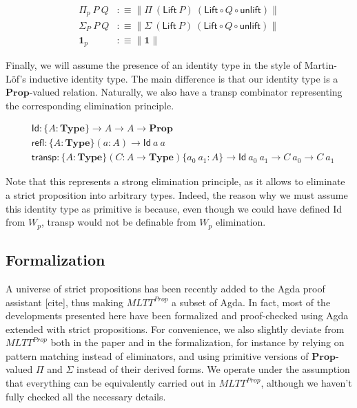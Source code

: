 \documentclass{easychair}
\newcommand{\mType}{\mathbf{Type}}
\newcommand{\mProp}{\mathbf{Prop}}
\begin{document}
\begin{align*}
  \Pi_p\ P\ Q & :\equiv \| \Pi\ (\textsf{Lift} \ P)\ (\textsf{Lift} \circ Q \circ \textsf{unlift}) \| \\
  \Sigma_P\ P\ Q & :\equiv \| \Sigma\ (\textsf{Lift} \ P)\ (\textsf{Lift} \circ Q \circ \textsf{unlift}) \| \\
  \mathbf{1}_p & :\equiv \| \mathbf{1} \|
\end{align*}

Finally, we will assume the presence of an identity type in the style of
Martin-L\"of's inductive identity type. The main difference is that our identity
type is a $\mProp$-valued relation. Naturally, we also have a \textsf{transp}
combinator representing the corresponding elimination principle.

\begin{align*}
  & \textsf{Id} : \{A : \mType \} \to A \to A \to \mProp \\
  & \textsf{refl} : \{A : \mType \} (a : A) \to \textsf{Id}\ a\ a \\
  & \textsf{transp} : \{A : \mType \} (C : A \to \mType) \{a_0\ a_1 : A\} \to \textsf{Id}\ a_0\ a_1 \to C\ a_0 \to C\ a_1
\end{align*}

Note that this
represents a strong elimination principle, as it allows to eliminate a strict
proposition into arbitrary types. Indeed, the reason why we must assume this
identity type as primitive is because, even though we could have defined
\textsf{Id} from $W_p$, \textsf{transp} would not be definable from $W_p$
elimination. 

\subsection{Formalization}

A universe of strict propositions has been recently added to the Agda proof
assistant [cite], thus making $MLTT^{Prop}$ a subset of Agda. In fact, most of
the developments presented here have been formalized and proof-checked using
Agda extended with strict propositions.
%
For convenience, we also slightly deviate from $MLTT^{Prop}$ both in the paper
and in the formalization, for instance by relying on pattern matching instead of
eliminators, and using primitive versions of $\mProp$-valued $\Pi$ and $\Sigma$
instead of their derived forms. We operate under the assumption that everything
can be equivalently carried out in $MLTT^{Prop}$, although we haven't fully
checked all the necessary details.
\end{document}
